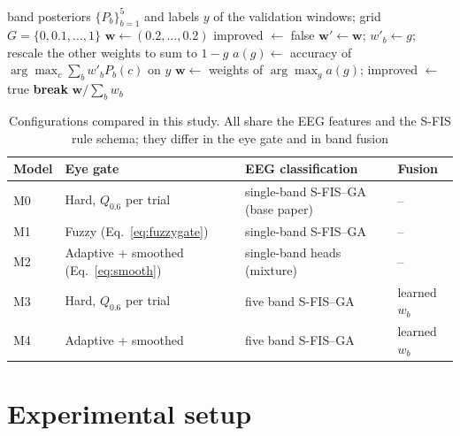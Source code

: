 \documentclass[10pt,twoside]{article}
\begin{document}
\begin{algorithm}[t]
\caption{Learning the fusion weights $w_b$ on a validation split}
\label{alg:fusion}
\footnotesize
\begin{algorithmic}[1]
\Require band posteriors $\{P_b\}_{b=1}^{5}$ and labels $y$ of the validation windows; grid $G=\{0,0.1,\dots,1\}$
\State $\mathbf w\gets(0.2,\dots,0.2)$
  \State improved $\gets$ false
      \State $\mathbf w'\gets\mathbf w$; $w'_b\gets g$; rescale the other weights to sum to $1-g$
      \State $a(g)\gets$ accuracy of $\arg\max_c\sum_b w'_b P_b(c)$ on $y$
    \EndFor
      \State $\mathbf w\gets$ weights of $\arg\max_g a(g)$; improved $\gets$ true
    \EndIf
  \EndFor
   \textbf{break} \EndIf
\EndFor
\State \Return $\mathbf w/\sum_b w_b$
\end{algorithmic}
\end{algorithm}

\begin{table}[t]
\caption{Configurations compared in this study. All share the EEG features and the S-FIS rule schema; they differ in the eye gate and in band fusion}
\label{tab:models}
\footnotesize
\begin{tabularx}{\linewidth}{@{}l l X l@{}}
\toprule
Model & Eye gate & EEG classification & Fusion \\
\midrule
M0 & Hard, $Q_{0.6}$ per trial & single-band S-FIS--GA (base paper) & -- \\
M1 & Fuzzy (Eq.~\ref{eq:fuzzygate}) & single-band S-FIS--GA & -- \\
M2 & Adaptive + smoothed (Eq.~\ref{eq:smooth}) & single-band heads (mixture) & -- \\
M3 & Hard, $Q_{0.6}$ per trial & five band S-FIS--GA & learned $w_b$ \\
M4 & Adaptive + smoothed & five band S-FIS--GA & learned $w_b$ \\
\bottomrule
\end{tabularx}
\end{table}

\section{Experimental setup}\label{sec:setup}
\end{document}
